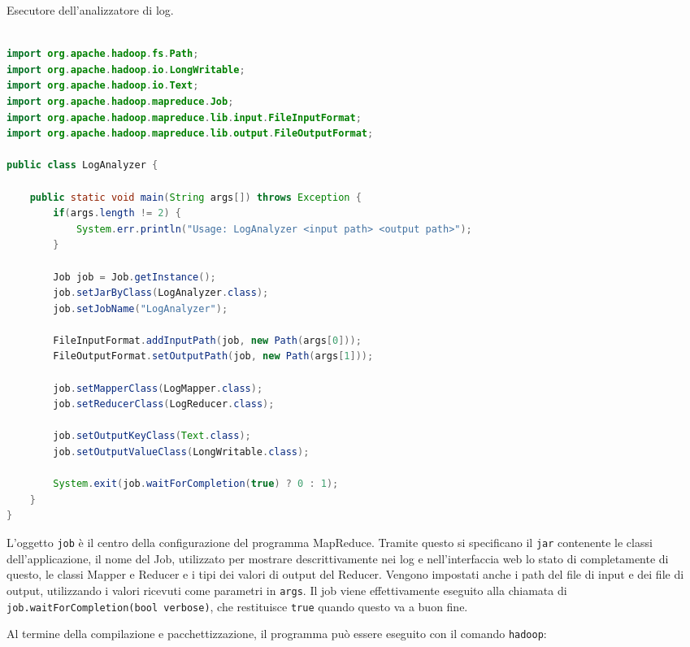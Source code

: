 \documentclass[italian,a4paper, twoside, 12pt]{report}
\begin{document}
\begin{codelisting}

\caption{Esecutore dell'analizzatore di log.}

\begin{lstlisting}[language=Java, label=lst:log-executor]

import org.apache.hadoop.fs.Path;
import org.apache.hadoop.io.LongWritable;
import org.apache.hadoop.io.Text;
import org.apache.hadoop.mapreduce.Job;
import org.apache.hadoop.mapreduce.lib.input.FileInputFormat;
import org.apache.hadoop.mapreduce.lib.output.FileOutputFormat;

public class LogAnalyzer {

    public static void main(String args[]) throws Exception {
        if(args.length != 2) {
            System.err.println("Usage: LogAnalyzer <input path> <output path>");
        }

        Job job = Job.getInstance();
        job.setJarByClass(LogAnalyzer.class);
        job.setJobName("LogAnalyzer");

        FileInputFormat.addInputPath(job, new Path(args[0]));
        FileOutputFormat.setOutputPath(job, new Path(args[1]));

        job.setMapperClass(LogMapper.class);
        job.setReducerClass(LogReducer.class);

        job.setOutputKeyClass(Text.class);
        job.setOutputValueClass(LongWritable.class);

        System.exit(job.waitForCompletion(true) ? 0 : 1);
    }
}
\end{lstlisting}

\end{codelisting}

L'oggetto \lstinline!job! è il centro della configurazione del programma
MapReduce. Tramite questo si specificano il \lstinline!jar! contenente
le classi dell'applicazione, il nome del Job, utilizzato per mostrare
descrittivamente nei log e nell'interfaccia web lo stato di
completamente di questo, le classi Mapper e Reducer e i tipi dei valori
di output del Reducer. Vengono impostati anche i path del file di input
e dei file di output, utilizzando i valori ricevuti come parametri in
\lstinline!args!. Il job viene effettivamente eseguito alla chiamata di
\lstinline!job.waitForCompletion(bool verbose)!, che restituisce
\lstinline!true! quando questo va a buon fine.

Al termine della compilazione e pacchettizzazione, il programma può
essere eseguito con il comando \lstinline!hadoop!:
\end{document}
